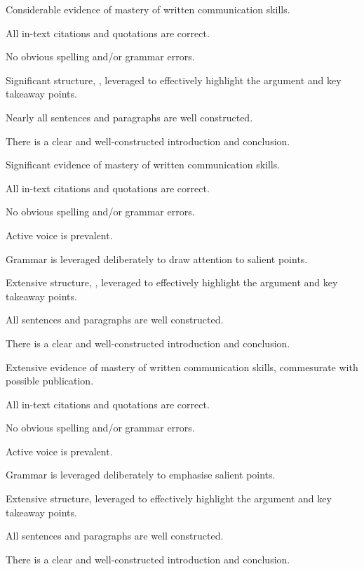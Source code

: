 \documentclass{../../fal_assignment}
\begin{document}
\begin{markingrubric}
        \grade 		Considerable evidence of mastery of written communication skills.
        \par 		All in-text citations and quotations are correct.
        \par 		No obvious spelling and/or grammar errors.
        \par 		Significant structure, , leveraged to effectively highlight the argument and key takeaway points.  
        \par 		Nearly all sentences and paragraphs are well constructed.
        \par 		There is a clear and well-constructed introduction and conclusion.
        
        \grade 		Significant evidence of mastery of written communication skills.
        \par 		All in-text citations and quotations are correct.
        \par 		No obvious spelling and/or grammar errors.
       \par 		Active voice is prevalent.
        \par 		Grammar is leveraged deliberately to draw attention to salient points.     
        \par 		Extensive structure, , leveraged to effectively highlight the argument and key takeaway points. 
        \par 		All sentences and paragraphs are well constructed.
        \par 		There is a clear and well-constructed introduction and conclusion.
        
        \grade 		Extensive evidence of mastery of written communication skills, commesurate with possible publication.
        \par 		All in-text citations and quotations are correct.
        \par 		No obvious spelling and/or grammar errors.
        \par 		Active voice is prevalent.
        \par 		Grammar is leveraged deliberately to emphasise salient points.     
        \par 		Extensive structure, leveraged to effectively highlight the argument and key takeaway points.
        \par 		All sentences and paragraphs are well constructed.
        \par 		There is a clear and well-constructed introduction and conclusion.

\end{markingrubric}
\end{document}
